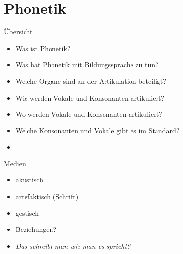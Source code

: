 \section{Phonetik}

\begin{frame}
  {Übersicht}
  \pause
  \begin{itemize}[<+->]
    \item Was ist \alert{Phonetik}?
    \item Was hat Phonetik mit \alert{Bildungssprache} zu tun?
    \item Welche \alert{Organe} sind an der Artikulation beteiligt?
    \item \alert{Wie} werden Vokale und Konsonanten artikuliert?
    \item \alert{Wo} werden Vokale und Konsonanten artikuliert?
    \item Welche Konsonanten und Vokale gibt es im \alert{Standard}?
      \Zeile
    \item {}
  \end{itemize}
\end{frame}

\begin{frame}
  {Medien}
  \pause
  \begin{itemize}[<+->]
    \item akustisch
    \item artefaktisch (\zB Schrift)
    \item gestisch
    \vspace{\baselineskip}
  \item Beziehungen?
  \item \textit{Das schreibt man wie man es spricht?}
  \end{itemize}
\end{frame}


